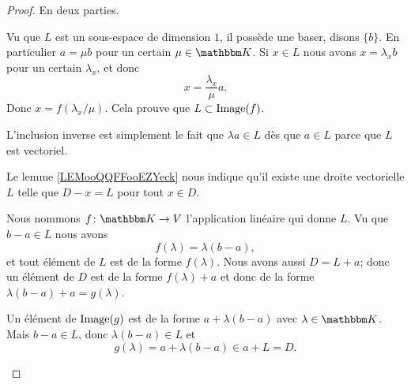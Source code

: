 \begin{proof}
    En deux parties.
    \begin{subproof}
        \item[Pour \ref{ITEMooYQCIooOrhRwj}]
            Vu que \( L\) est un sous-espace de dimension \( 1\), il possède une baser, disons \( \{ b \}\). En particulier \( a=\mu b\) pour un certain \( \mu\in \eK\). Si \( x\in L\) nous avons \( x=\lambda_x b\) pour un certain \( \lambda_x\), et donc
            \begin{equation}
                x=\frac{ \lambda_x }{ \mu }a.
            \end{equation}
            Donc \( x=f(\lambda_x/\mu)\). Cela prouve que \( L\subset\operatorname{Image}(f)\).

            L'inclusion inverse est simplement le fait que \( \lambda a\in L\) dès que \( a\in L\) parce que \( L\) est vectoriel.
        \item[Pour \ref{ITEMooZIGMooGruFMP}]
            Le lemme \ref{LEMooQQFFooEZYeck} nous indique qu'il existe une droite vectorielle \( L\) telle que \( D-x=L\) pour tout \( x\in D\).
            \begin{subproof}
                \item[\( D\subset\Image(g)\)]
                    Nous nommons \( f\colon \eK\to V\) l'application linéaire qui donne \( L\). Vu que \( b-a\in L\) nous avons
                    \begin{equation}
                        f(\lambda)=\lambda(b-a),
                    \end{equation}
                    et tout élément de \( L\) est de la forme \( f(\lambda)\). Nous avons aussi \( D=L+a\); donc un élément de \( D\) est de la forme \( f(\lambda)+a\) et donc de la forme \( \lambda(b-a)+a=g(\lambda)\).
                \item[\( \Image(g)\subset D\)]
                    Un élément de \( \operatorname{Image}(g)\) est de la forme \( a+\lambda(b-a)\) avec \( \lambda\in \eK\). Mais \( b-a\in L\), donc \( \lambda(b-a)\in L\) et 
                    \begin{equation}
                        g(\lambda)=a+\lambda(b-a)\in a+L=D.
                    \end{equation}
            \end{subproof}
    \end{subproof}
\end{proof}

